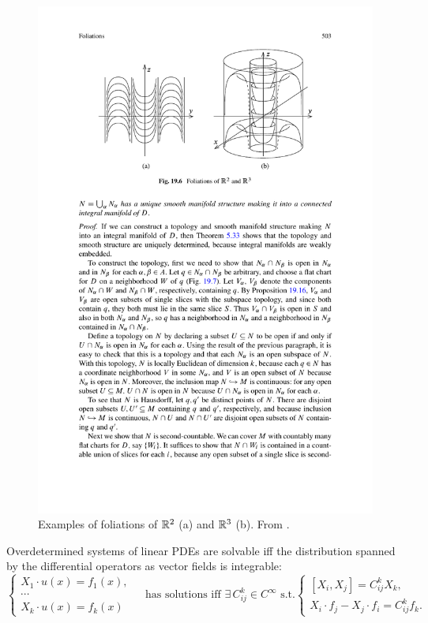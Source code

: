 \begin{figure}[tp]
    \centering
    \includegraphics[scale=0.8]{figures/foliations.pdf}
    \caption{Examples of foliations of $\mathbb{R}^2$ (a) and $\mathbb{R}^3$ (b). From \cite{Lee}.}
    \label{fig:foliations}
\end{figure}

\begin{example}
    Overdetermined systems of linear PDEs are solvable iff the distribution spanned by the differential operators as vector fields is integrable:
    \[\begin{cases}
        X_1\cdot u(x)=f_1(x),&\\
        \cdots &\\
        X_k\cdot u(x)=f_k(x)&
    \end{cases}
    \text{ has solutions iff }\exists\,C^k_{ij}\in C^\infty\text{ s.t.}
    \begin{cases}
        [X_i,X_j]=C^k_{ij}X_k,&\\
        X_i\cdot f_j-X_j\cdot f_i=C^k_{ij}f_k.&
    \end{cases}
    \]
\end{example}

